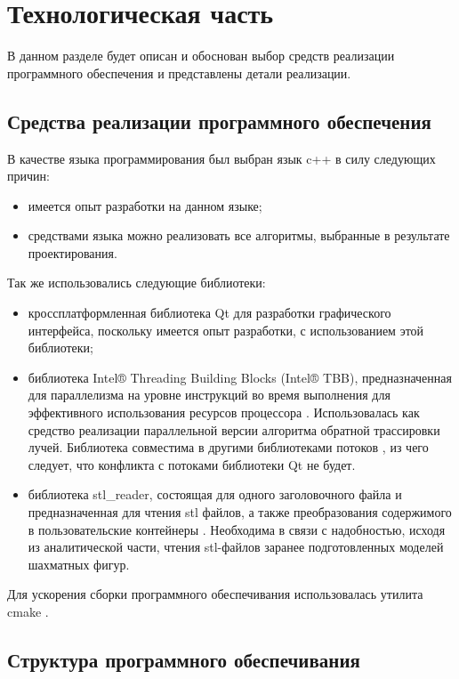 \chapter{Технологическая часть}

В данном разделе будет описан и обоснован выбор средств реализации программного обеспечения и представлены детали реализации.

\section{Средства реализации программного обеспечения}

В качестве языка программирования был выбран язык c++ в силу следующих причин:

\begin{itemize}
	\item имеется опыт разработки на данном языке;
	\item средствами языка можно реализовать все алгоритмы, выбранные в результате проектирования.
\end{itemize}

Так же использовались следующие библиотеки:

\begin{itemize}
	\item кроссплатформленная библиотека Qt для разработки графического интерфейса, поскольку имеется опыт разработки, с использованием этой библиотеки;
	\item библиотека Intel® Threading Building Blocks (Intel® TBB), предназначенная для параллелизма на уровне инструкций во время выполнения для эффективного использования ресурсов процессора \cite{tbb}. Использовалась как средство реализации параллельной версии алгоритма обратной трассировки лучей. Библиотека совместима в другими библиотеками потоков \cite{tbb}, из чего следует, что конфликта с потоками библиотеки Qt не будет.
	\item библиотека stl\_reader, состоящая для одного заголовочного файла и предназначенная для чтения stl файлов, а также преобразования содержимого в пользовательские контейнеры \cite{stlreader}. Необходима в связи с надобностью, исходя из аналитической части, чтения stl-файлов заранее подготовленных  моделей шахматных фигур.
\end{itemize}

Для ускорения сборки программного обеспечивания использовалась утилита cmake \cite{cmake}.

\section{Структура программного обеспечивания}

